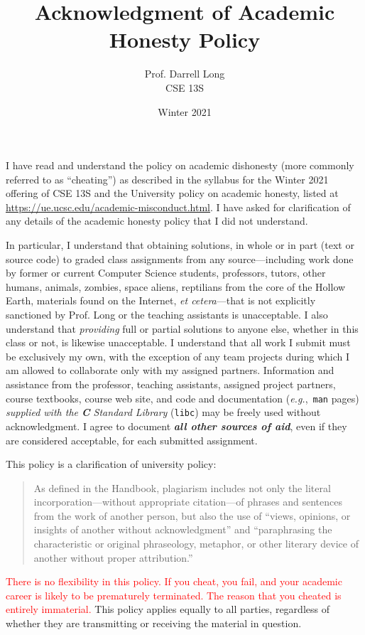 \documentclass{article}
\title{Acknowledgment of Academic Honesty Policy}
\author{Prof.\xspace Darrell Long \\
CSE 13S}
\date{Winter 2021}
\newcommand{\surl}[1]{{\fontsize{9}{11}\selectfont\url{#1}}}
\begin{document}
\maketitle
I have read and understand the policy on academic dishonesty (more
commonly referred to as ``cheating'') as described in the syllabus
for the Winter 2021 offering of CSE 13S
and the University policy on academic honesty, listed at
\surl{https://ue.ucsc.edu/academic-misconduct.html}.  I have asked for
clarification of any details of the academic honesty policy that I
did not understand.

In particular, I understand that obtaining solutions, in whole or
in part (text or source code) to graded class assignments from any
source---including work done by former or current Computer Science
students, professors, tutors, other humans, animals, zombies, space
aliens, reptilians from the core of the Hollow Earth,
materials found on the Internet, \emph{et cetera}---that
is not explicitly sanctioned by Prof.\xspace Long or the teaching assistants is unacceptable.
I also understand that \emph{providing} full or partial solutions
to anyone else, whether in this class or not, is likewise unacceptable.
I understand that all work I submit must be exclusively my own,
with the exception of any team projects during which I am allowed
to collaborate only with my assigned partners.  Information and
assistance from the professor, teaching assistants, assigned project partners, course
textbooks, course web site, and code and documentation
(\emph{e.g.},~\texttt{man} pages) \emph{supplied with the \textbf{C} Standard
Library} (\texttt{libc})
may be freely used without acknowledgment.  I agree to document
\textbf{\emph{all other sources of aid}}, even if they are considered
acceptable, for each submitted assignment.

This policy is a clarification of university policy:
\begin{quote}
As defined in the Handbook, plagiarism includes not only the literal
incorporation---without appropriate citation---of phrases and
sentences from the work of another person, but also the use of
``views, opinions, or insights of another without acknowledgment''
and ``paraphrasing the characteristic or original phraseology,
metaphor, or other literary device of another without proper
attribution.''
\end{quote}


\textcolor{red}{There is no flexibility in this policy. If you
cheat, you fail, and your academic career is likely to be prematurely
terminated. The reason that you cheated is entirely immaterial.}
This policy applies equally to all parties, regardless of whether
they are transmitting or receiving the material in question.
\end{document}
